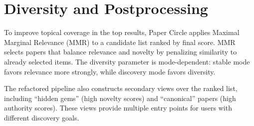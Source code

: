 \section{Diversity and Postprocessing}
To improve topical coverage in the top results, Paper Circle applies Maximal Marginal Relevance (MMR) to a candidate list ranked by final score. MMR selects papers that balance relevance and novelty by penalizing similarity to already selected items. The diversity parameter is mode-dependent: stable mode favors relevance more strongly, while discovery mode favors diversity.

The refactored pipeline also constructs secondary views over the ranked list, including ``hidden gems'' (high novelty scores) and ``canonical'' papers (high authority scores). These views provide multiple entry points for users with different discovery goals.
